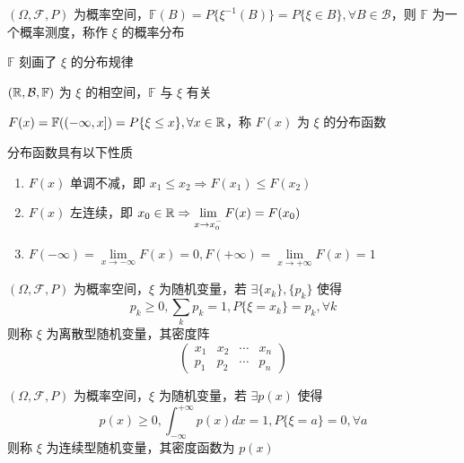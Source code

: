 \documentclass[12pt,a4paper]{amsart}
\begin{document}
\begin{definition}[分布]
    $(\Omega, \mathcal{F}, P)$ 为概率空间，$\mathbb{F}(B) = P\{\xi^{-1}(B)\} = P\{\xi\in B\}, \forall B\in\mathcal{B}$，则 $\mathbb{F}$ 为一个概率测度，称作 $\xi$ 的概率分布
\end{definition}

$\mathbb{F}$ 刻画了 $\xi$ 的分布规律

\begin{definition}[相空间]
    $(\mathbb{R}, \mathcal{B}, \mathbb{F})$ 为 $\xi$ 的相空间，$\mathbb{F}$ 与 $\xi$ 有关
\end{definition}

\begin{definition}[分布函数]
    $F(x) = \mathbb{F}((-\infty, x]) = P\{\xi\leq x\}, \forall x\in\mathbb{R}$，称 $F(x)$ 为 $\xi$ 的分布函数
\end{definition}

分布函数具有以下性质

\begin{proposition}
    \begin{enumerate}
        \item $F(x)$ 单调不减，即 $x_1\leq x_2 \Rightarrow F(x_1)\leq F(x_2)$   
        \item $F(x)$ 左连续，即 $x_0\in\mathbb{R} \Rightarrow \lim\limits_{x\to x_0^-}F(x)=F(x_0)$
        \item $F(-\infty) = \lim\limits_{x\to-\infty}F(x)=0, F(+\infty) = \lim\limits_{x\to+\infty}F(x)=1$
    \end{enumerate}
\end{proposition}

\begin{definition}[离散型]
    $(\Omega, \mathcal{F}, P)$ 为概率空间，$\xi$ 为随机变量，若 $\exists \{x_k\}, \{p_k\}$ 使得
    \begin{equation}
        p_k \geq 0, \sum_{k}p_k = 1, P\{\xi = x_k\} = p_k, \forall k
    \end{equation}
    则称 $\xi$ 为离散型随机变量，其密度阵
    \begin{equation}
        \begin{pmatrix}
            x_1 & x_2 & \cdots & x_n \\
            p_1 & p_2 & \cdots & p_n
        \end{pmatrix}
    \end{equation}
\end{definition}

\begin{definition}[连续型]
    $(\Omega, \mathcal{F}, P)$ 为概率空间，$\xi$ 为随机变量，若 $\exists p(x)$ 使得
    \begin{equation}
        p(x) \geq 0, \int_{-\infty}^{+\infty}p(x)dx = 1, P\{\xi=a\} = 0, \forall a
    \end{equation}
    则称 $\xi$ 为连续型随机变量，其密度函数为 $p(x)$
\end{definition}
\end{document}
